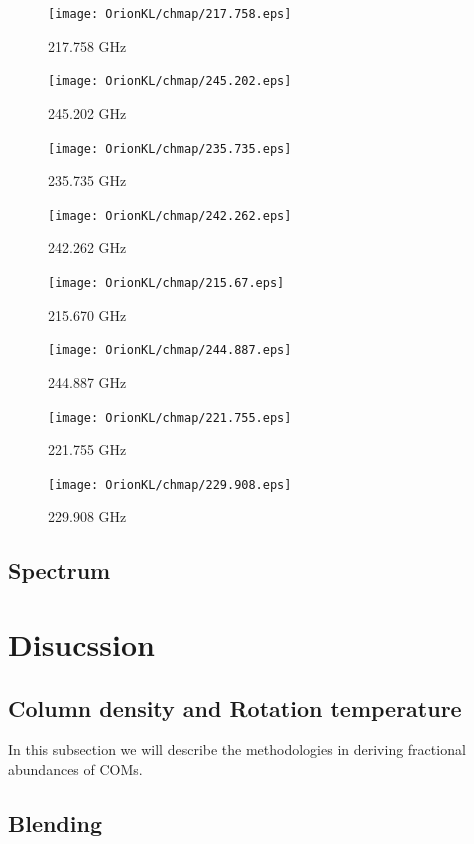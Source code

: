 \begin{figure}[htbp]
  \centering
  \texttt{[image: OrionKL/chmap/217.758.eps]}
  \caption{217.758 GHz}
  \label{ch_0}
\end{figure}

\begin{figure}[htbp]
  \centering
  \texttt{[image: OrionKL/chmap/245.202.eps]}
  \caption{245.202 GHz}
  \label{ch_1}
\end{figure}

\begin{figure}[htbp]
  \centering
  \texttt{[image: OrionKL/chmap/235.735.eps]}
  \caption{235.735 GHz}
  \label{ch_2}
\end{figure}

\begin{figure}[htbp]
  \centering
  \texttt{[image: OrionKL/chmap/242.262.eps]}
  \caption{242.262 GHz}
  \label{ch_3}
\end{figure}

\begin{figure}[htbp]
  \centering
  \texttt{[image: OrionKL/chmap/215.67.eps]}
  \caption{215.670 GHz}
  \label{ch_4}
\end{figure}

\begin{figure}[htbp]
  \centering
  \texttt{[image: OrionKL/chmap/244.887.eps]}
  \caption{244.887 GHz}
  \label{ch_5}
\end{figure}

\begin{figure}[htbp]
  \centering
  \texttt{[image: OrionKL/chmap/221.755.eps]}
  \caption{221.755 GHz}
  \label{ch_6}
\end{figure}

\begin{figure}[htbp]
  \centering
  \texttt{[image: OrionKL/chmap/229.908.eps]}
  \caption{229.908 GHz}
  \label{ch_7}
\end{figure}

\subsection{Spectrum}



\section{Disucssion}
\subsection{Column density and Rotation temperature}

In this subsection we will describe the methodologies in deriving fractional abundances
of COMs.

\subsection{Blending}